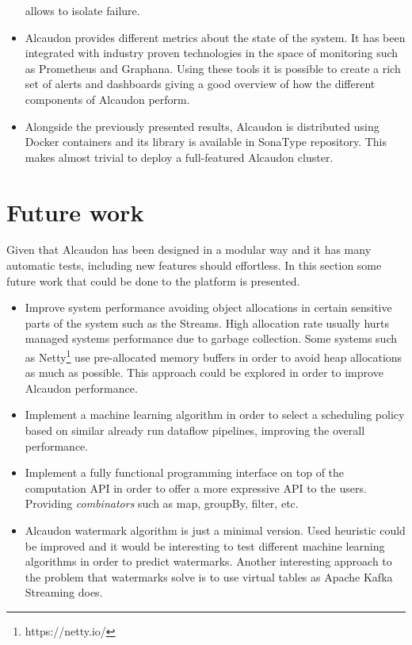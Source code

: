 \begin{itemize}
  allows to isolate failure.
\item Alcaudon provides different metrics about the state of the system. It has been
  integrated with industry proven technologies in the space of monitoring such as
  Prometheus and Graphana. Using these tools it is possible to create a rich set
  of alerts and dashboards giving a good overview of how the different components
  of Alcaudon perform.
\item Alongside the previously presented results, Alcaudon is distributed using Docker
  containers and its library is available in SonaType repository. This makes almost
  trivial to deploy a full-featured Alcaudon cluster.
\end{itemize}

\section{Future work}

Given that Alcaudon has been designed in a modular way and it has many automatic
tests, including new features should effortless. In this section some future work
that could be done to the platform is presented.

\begin{itemize}
\item Improve system performance avoiding object allocations in certain
  sensitive parts of the system such as the Streams. High allocation rate
  usually hurts managed systems performance due to garbage collection. Some
  systems such as Netty\footnote{https://netty.io/} use pre-allocated memory buffers
  in order to avoid heap allocations as much as possible. This approach could be
  explored in order to improve Alcaudon performance.
\item Implement a machine learning algorithm in order to select a scheduling policy
  based on similar already run dataflow pipelines, improving the overall performance.
\item Implement a fully functional programming interface on top of the
  computation API in order to offer a more expressive API to the users.
  Providing \textit{combinators} such as map, groupBy, filter, etc.
\item Alcaudon watermark algorithm is just a minimal version. Used heuristic
  could be improved and it would be interesting to test different machine
  learning algorithms in order to predict watermarks. Another interesting
  approach to the problem that watermarks solve is to use virtual tables as
  Apache Kafka Streaming does\cite{kafkastreams}.
\end{itemize}
